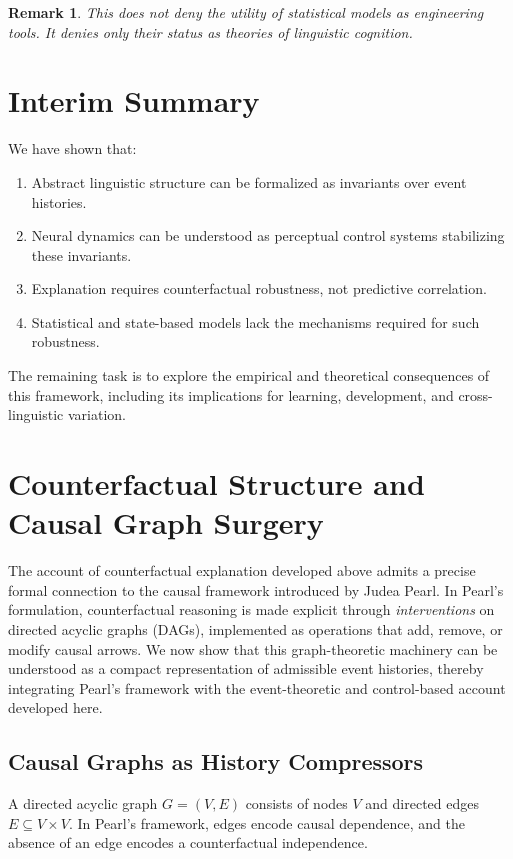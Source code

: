 \documentclass[11pt]{article}
\newtheorem{remark}{Remark}
\begin{document}
\begin{remark}
This does not deny the utility of statistical models as engineering tools. It denies only their status as theories of linguistic cognition.
\end{remark}

\section{Interim Summary}

We have shown that:
\begin{enumerate}
  \item Abstract linguistic structure can be formalized as invariants over event histories.
  \item Neural dynamics can be understood as perceptual control systems stabilizing these invariants.
  \item Explanation requires counterfactual robustness, not predictive correlation.
  \item Statistical and state-based models lack the mechanisms required for such robustness.
\end{enumerate}

The remaining task is to explore the empirical and theoretical consequences of this framework, including its implications for learning, development, and cross-linguistic variation.

\section{Counterfactual Structure and Causal Graph Surgery}

The account of counterfactual explanation developed above admits a precise formal connection to the causal framework introduced by Judea Pearl. In Pearl’s formulation, counterfactual reasoning is made explicit through \emph{interventions} on directed acyclic graphs (DAGs), implemented as operations that add, remove, or modify causal arrows. We now show that this graph-theoretic machinery can be understood as a compact representation of admissible event histories, thereby integrating Pearl’s framework with the event-theoretic and control-based account developed here.

\subsection{Causal Graphs as History Compressors}

A directed acyclic graph $G = (V, E)$ consists of nodes $V$ and directed edges $E \subseteq V \times V$. In Pearl’s framework, edges encode causal dependence, and the absence of an edge encodes a counterfactual independence.
\end{document}
